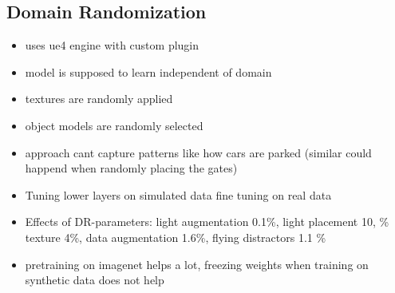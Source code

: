 \subsection{Domain Randomization\cite{Tremblay2018a}}
\begin{itemize}
	\item uses ue4 engine with custom plugin
	\item model is supposed to learn independent of domain
	\item textures are randomly applied
	\item object models are randomly selected
	\item approach cant capture patterns like how cars are parked (similar could happend when randomly placing the gates)
	\item Tuning lower layers on simulated data fine tuning on real data
	\item Effects of DR-parameters: light augmentation 0.1\%, light placement 10, \% texture 4\%, data augmentation 1.6\%, flying distractors 1.1 \%
	\item pretraining on imagenet helps a lot, freezing weights when training on synthetic data does not help
\end{itemize}